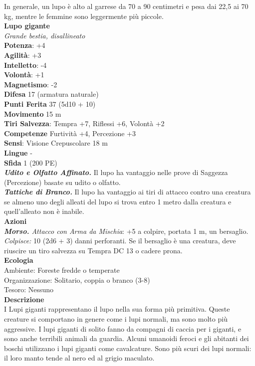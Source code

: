 \begin{multicols}{2}
In generale, un lupo è alto al garrese da 70 a 90 centimetri e pesa dai 22,5 ai 70 kg, mentre le femmine sono leggermente più piccole. \\

\medskip\textbf{Lupo gigante}\\
\emph{Grande bestia, disallineato}\\
\textbf{Potenza}: +4\\
\textbf{Agilità}: +3\\
\textbf{Intelletto}: -4\\
\textbf{Volontà}: +1\\
\textbf{Magnetismo}: -2\\
\textbf{Difesa} 17 (armatura naturale)\\
\textbf{Punti Ferita} 37 (5d10 + 10)\\
\textbf{Movimento} 15 m\\
\textbf{Tiri Salvezza}: Tempra +7, Riflessi +6, Volontà +2 \\
\textbf{Competenze} Furtività +4, Percezione +3\\
\textbf{Sensi}: Visione Crepuscolare 18 m\\
\textbf{Lingue} -\\
\textbf{Sfida} 1 (200 PE)\smallskip\\
\emph{\textbf{Udito e Olfatto Affinato.}} Il lupo ha vantaggio nelle prove di Saggezza (Percezione) basate su udito o olfatto.\\
\emph{\textbf{Tattiche di Branco.}} Il lupo ha vantaggio ai tiri di attacco contro una creatura se almeno uno degli alleati del lupo si trova entro 1 metro dalla creatura e quell'alleato non è inabile.\\
\smallskip\textbf{Azioni}\\
\emph{\textbf{Morso.} Attacco con Arma da Mischia}: +5 a colpire, portata 1 m, un bersaglio.\\
\emph{Colpisce:} 10 (2d6 + 3) danni perforanti. Se il bersaglio è una creatura, deve riuscire un tiro salvezza su Tempra DC 13 o cadere prona.\\
\textbf{Ecologia}\\
Ambiente: Foreste fredde o temperate\\
Organizzazione: Solitario, coppia o branco (3-8)\\
Tesoro: Nessuno\\
\textbf{Descrizione}\\

I Lupi giganti rappresentano il lupo nella sua forma più primitiva. Queste creature si comportano in genere come i lupi normali, ma sono molto più aggressive. I lupi giganti di solito fanno da compagni di caccia per i giganti, e sono anche terribili animali da guardia. Alcuni umanoidi feroci e gli abitanti dei boschi utilizzano i lupi giganti come cavalcature. Sono più scuri dei lupi normali: il loro manto tende al nero ed al grigio maculato.\\


\end{multicols}
